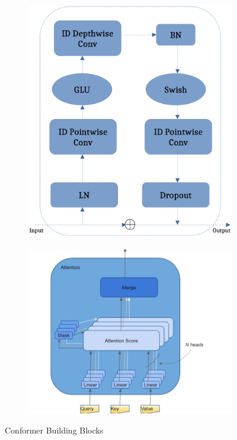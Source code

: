 \documentclass[14pt,a4paper]{article}
\begin{document}
\begin{figure}
    \centering
    \begin{subfigure}[b]{0.45\textwidth}
    \includegraphics[width=\textwidth]{../images/conv.png}
    \end{subfigure}
    \begin{subfigure}[b]{0.45\textwidth}
    \includegraphics[width=\textwidth]{../images/attention.png}
    \end{subfigure}
    \label{fig:ESPNet}
    \caption{Conformer Building Blocks}
\end{figure}
\end{document}
